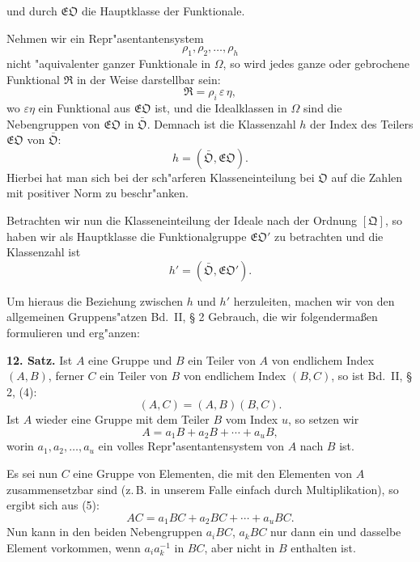 \documentclass[12pt,a4paper]{article}
\theoremstyle{plain}
\begin{document}
und durch $\mathfrak{E}\mathfrak{O}$ die Hauptklasse der Funktionale.

Nehmen wir ein Repr"asentantensystem
\[
\rho_1, \rho_2, \ldots, \rho_h
\]
nicht "aquivalenter ganzer Funktionale in $\Omega$, so wird jedes ganze oder gebrochene Funktional $\mathfrak{R}$ in der Weise darstellbar sein:
\[
\mathfrak{R} = \rho_i\,\varepsilon\,\eta,
\]
wo $\varepsilon\eta$ ein Funktional aus $\mathfrak{E}\mathfrak{O}$ ist, und die Idealklassen in $\Omega$ sind die Nebengruppen von $\mathfrak{E}\mathfrak{O}$ in $\bar{\mathfrak{O}}$. Demnach ist die Klassenzahl $h$ der Index des Teilers $\mathfrak{E}\mathfrak{O}$ von $\bar{\mathfrak{O}}$:
\begin{equation}
h = (\bar{\mathfrak{O}}, \mathfrak{E}\mathfrak{O}).
\tag{2}
\end{equation}
Hierbei hat man sich bei der sch"arferen Klasseneinteilung bei $\mathfrak{O}$ auf die Zahlen mit positiver Norm zu beschr"anken.

Betrachten wir nun die Klasseneinteilung der Ideale nach der Ordnung $[\mathfrak{Q}]$, so haben wir als Hauptklasse die Funktionalgruppe $\mathfrak{E}\mathfrak{O}'$ zu betrachten und die Klassenzahl ist
\begin{equation}
h' = (\bar{\mathfrak{O}}, \mathfrak{E}\mathfrak{O}').
\tag{3}
\end{equation}

Um hieraus die Beziehung zwischen $h$ und $h'$ herzuleiten, machen wir von den allgemeinen Gruppens"atzen Bd.~II, \S{} 2 Gebrauch, die wir folgenderma\ss en formulieren und erg"anzen:

\textbf{12. Satz.} Ist $A$ eine Gruppe und $B$ ein Teiler von $A$ von endlichem Index $(A, B)$, ferner $C$ ein Teiler von $B$ von endlichem Index $(B, C)$, so ist Bd.~II, \S{} 2, (4):
\begin{equation}
(A, C) = (A, B)(B, C).
\tag{4}
\end{equation}
Ist $A$ wieder eine Gruppe mit dem Teiler $B$ vom Index $u$, so setzen wir
\begin{equation}
A = a_1 B + a_2 B + \cdots + a_u B,
\tag{5}
\end{equation}
worin $a_1, a_2, \ldots, a_u$ ein volles Repr"asentantensystem von $A$ nach $B$ ist.

Es sei nun $C$ eine Gruppe von Elementen, die mit den Elementen von $A$ zusammensetzbar sind (z.\,B. in unserem Falle einfach durch Multiplikation), so ergibt sich aus (5):
\begin{equation}
AC = a_1 BC + a_2 BC + \cdots + a_u BC.
\tag{6}
\end{equation}
Nun kann in den beiden Nebengruppen $a_i BC$, $a_k BC$ nur dann ein und dasselbe Element vorkommen, wenn $a_i a_k^{-1}$ in $BC$, aber nicht in $B$ enthalten ist.
\end{document}
